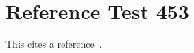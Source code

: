 \documentclass{article}
\begin{document}
\section{Reference Test 453}
This cites a reference~\cite{test453}.

\end{document}
